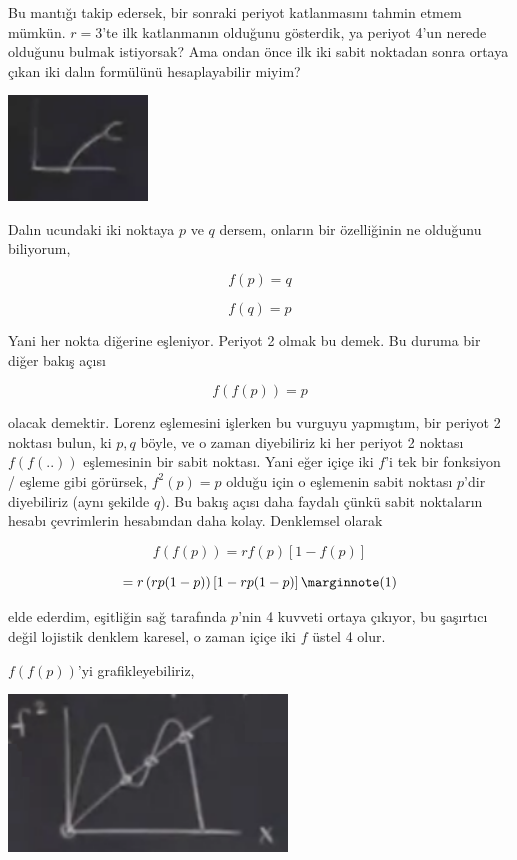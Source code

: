 \documentclass[12pt,fleqn]{article}\usepackage{../../common}
\begin{document}
Bu mantığı takip edersek, bir sonraki periyot katlanmasını tahmin etmem
mümkün. $r=3$'te ilk katlanmanın olduğunu gösterdik, ya periyot 4'un nerede
olduğunu bulmak istiyorsak? Ama ondan önce ilk iki sabit noktadan sonra
ortaya çıkan iki dalın formülünü hesaplayabilir miyim? 

\includegraphics[width=10em]{19_15.png}

Dalın ucundaki iki noktaya $p$ ve $q$ dersem, onların bir özelliğinin ne
olduğunu biliyorum, 

$$ f(p) = q$$

$$ f(q) = p$$

Yani her nokta diğerine eşleniyor. Periyot 2 olmak bu demek. Bu duruma bir
diğer bakış açısı

$$ f(f(p)) = p$$ 

olacak demektir. Lorenz eşlemesini işlerken bu vurguyu yapmıştım, bir
periyot 2 noktası bulun, ki $p,q$ böyle, ve o zaman diyebiliriz ki her
periyot 2 noktası $f(f(..))$ eşlemesinin bir sabit noktası. Yani eğer içiçe
iki $f$'i tek bir fonksiyon / eşleme gibi görürsek, $f^2(p) = p$ olduğu
için o eşlemenin sabit noktası $p$'dir diyebiliriz (aynı şekilde $q$). Bu
bakış açısı daha faydalı çünkü sabit noktaların hesabı çevrimlerin
hesabından daha kolay. Denklemsel olarak 

$$ f(f(p)) = r f(p) \left[ 1- f(p) \right] $$

$$ = r \left( rp (1-p) \right) \left[ 1-rp(1-p)\right] 
\mlabel{1}$$

elde ederdim, eşitliğin sağ tarafında $p$'nin 4 kuvveti ortaya çıkıyor, bu
şaşırtıcı değil lojistik denklem karesel, o zaman içiçe iki $f$ üstel 4
olur. 

$f(f(p))$'yi grafikleyebiliriz, 

\includegraphics[width=20em]{19_16.png}
\end{document}
